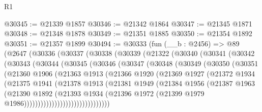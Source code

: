 \begin{lexlean}{R1}
\begin{coremodule}
@30345 := @21339 @1857
@30346 := @21342 @1864
@30347 := @21345 @1871
@30348 := @21348 @1878
@30349 := @21351 @1885
@30350 := @21354 @1892
@30351 := @21357 @1899
@30494 := @30333
    (fun (__b : @2456) =>
    @89
      (@2647
        (@30336
          (@30337
            (@30338
              (@30339
                (@21322
                  (@30340
                    (@30341
                      (@30342
                        (@30343
                          (@30344
                            (@30345
                              (@30346
                                (@30347
                                  (@30348
                                    (@30349
                                      (@30350
                                        (@30351
                                          (@21360
                                            @1906
                                            (@21363
                                              @1913
                                              (@21366
                                                @1920
                                                (@21369
                                                  @1927
                                                  (@21372
                                                    @1934
                                                    (@21375
                                                      @1941
                                                      (@21378
                                                        @1913
                                                        (@21381
                                                          @1949
                                                          (@21384
                                                            @1956
                                                            (@21387
                                                              @1963
                                                              (@21390
                                                                @1892
                                                                (@21393
                                                                  @1934
                                                                  (@21396
                                                                    @1972
                                                                    (@21399
                                                                      @1979
                                                                      @1986)))))))))))))))))))))))))))))))

\end{coremodule}
\end{lexlean}
